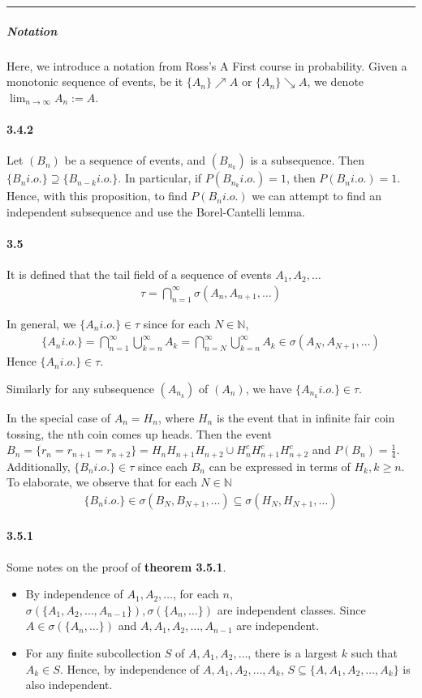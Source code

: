 \documentclass[a4paper]{article}
\newcommand{\nat}[0]{\mathbb{N}} %
\newcommand{\limitinf}[1][n]{\lim_{#1\rightarrow \infty}} %
\newcommand{\seq}[2]{#1_1,#1_2,\dots,#1_{#2}} %
\newcommand{\infseq}[1]{#1_1,#1_2,\dots} %
\newcommand{\io}[1]{#1 \mathit{i.o.}} %
\newcommand{\divider}[0]{\begin{center}
\rule{16cm}{0.5pt}
\end{center}}
\begin{document}
\divider

\subparagraph{Notation} Here, we introduce a notation from Ross's A First course in probability. Given a monotonic sequence of events, be it $\{A_n\}\nearrow A$ or $\{A_n\}\searrow A$, we denote $\limitinf A_n := A$.

\paragraph{3.4.2} Let $(B_n)$ be a sequence of events, and $(B_{n_k})$ is a subsequence. Then $\{\io{B_n}\}\supseteq \{\io{B_{n-k}}\}$. In particular, if $P(\io{B_{n_k}}) = 1$, then $P(\io{B_n}) = 1$. Hence, with this proposition, to find $P(\io{B_n})$ we can attempt to find an independent subsequence and use the Borel-Cantelli lemma.

\paragraph{3.5} It is defined that the tail field of a sequence of events $\infseq{A}$
\begin{align*}
	\tau = \bigcap_{n=1}^\infty\sigma(A_n,A_{n+1},\dots)
\end{align*}

In general, we $\{\io{A_n}\}\in \tau$ since for each $N\in\nat$, 
\begin{align*}
	\{\io{A_n}\} = \bigcap_{n=1}^\infty \bigcup_{k=n}^\infty A_k = \bigcap_{n=N}^\infty \bigcup_{k=n}^\infty A_k \in \sigma(A_N, A_{N+1},\dots)
\end{align*}
Hence $\{\io{A_n}\}\in \tau$.

Similarly for any subsequence $(A_{n_k})$ of $(A_n)$, we have $\{\io{A_{n_k}}\}\in\tau$.

In the special case of $A_n = H_n$, where $H_n$ is the event that in infinite fair coin tossing, the nth coin comes up heads. Then the event $B_n = \{r_n = r_{n+1} = r_{n+2}\} = H_nH_{n+1}H_{n+2} \cup H_n^cH_{n+1}^cH_{n+2}^c$ and $P(B_n) = \frac{1}{4}$. Additionally, $\{\io{B_n}\}\in\tau$ since each $B_n$ can be expressed in terms of $H_k, k\geq n$. To elaborate, we observe that for each $N\in\nat$
\begin{align*}
	\{\io{B_n}\}\in \sigma(B_N, B_{N+1},\dots)\subseteq \sigma(H_N, H_{N+1},\dots)
\end{align*}

\paragraph{3.5.1} Some notes on the proof of \textbf{theorem 3.5.1}.
\begin{itemize}
	\item By independence of $\infseq{A}$, for each $n$, $\sigma(\{\seq{A}{n-1}\}),\sigma(\{A_n,\dots\})$ are independent classes. Since $A\in \sigma(\{A_n,\dots\})$ and $A,\seq{A}{n-1}$ are independent.
	\item For any finite subcollection $S$ of $A,\infseq{A}$, there is a largest $k$ such that $A_k\in S$. Hence, by independence of $A,\seq{A}{k}$, $S\subseteq \{A,\seq{A}{k}\}$ is also independent.
\end{itemize}
\end{document}
